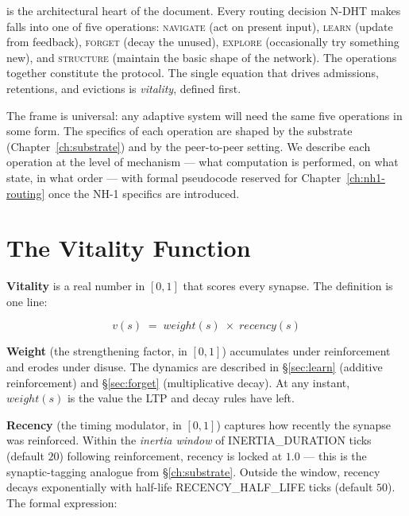 \documentclass[twoside,nobib]{tufte-book}
\newcommand{\NDHT}{N-DHT\xspace}
\begin{document}
 is the architectural heart of the
document. Every routing decision \NDHT makes falls into one of
five operations: \textsc{navigate} (act on present input),
\textsc{learn} (update from feedback), \textsc{forget} (decay the
unused), \textsc{explore} (occasionally try something new), and
\textsc{structure} (maintain the basic shape of the network). The
operations together constitute the protocol. The single equation
that drives admissions, retentions, and evictions is
\emph{vitality}, defined first.

The frame is universal: any adaptive system will need the same
five operations in some form. The specifics of each operation are
shaped by the substrate (Chapter~\ref{ch:substrate}) and by the
peer-to-peer setting. We describe each operation at the level of
mechanism --- what computation is performed, on what state, in
what order --- with formal pseudocode reserved for
Chapter~\ref{ch:nh1-routing} once the NH-1 specifics are
introduced.

\section{The Vitality Function}
\label{sec:vitality}

\textbf{Vitality} is a real number in $[0, 1]$ that scores every
synapse. The definition is one line:

\begin{equation}
  v(s) \;=\; \mathit{weight}(s) \;\times\; \mathit{recency}(s)
  \label{eq:vitality}
\end{equation}

\textbf{Weight} (the strengthening factor, in $[0, 1]$) accumulates
under reinforcement and erodes under disuse. The dynamics are
described in \S\ref{sec:learn} (additive reinforcement) and
\S\ref{sec:forget} (multiplicative decay). At any instant,
$\mathit{weight}(s)$ is the value the LTP and decay rules have
left.

\textbf{Recency} (the timing modulator, in $[0, 1]$) captures how
recently the synapse was reinforced. Within the
\emph{inertia window} of \textsc{INERTIA\_DURATION} ticks (default
$20$) following reinforcement, recency is locked at $1.0$ ---
this is the synaptic-tagging analogue from
\S\ref{ch:substrate}. Outside the window, recency decays exponentially with
half-life \textsc{RECENCY\_HALF\_LIFE} ticks (default $50$). The
formal expression:
\end{document}
